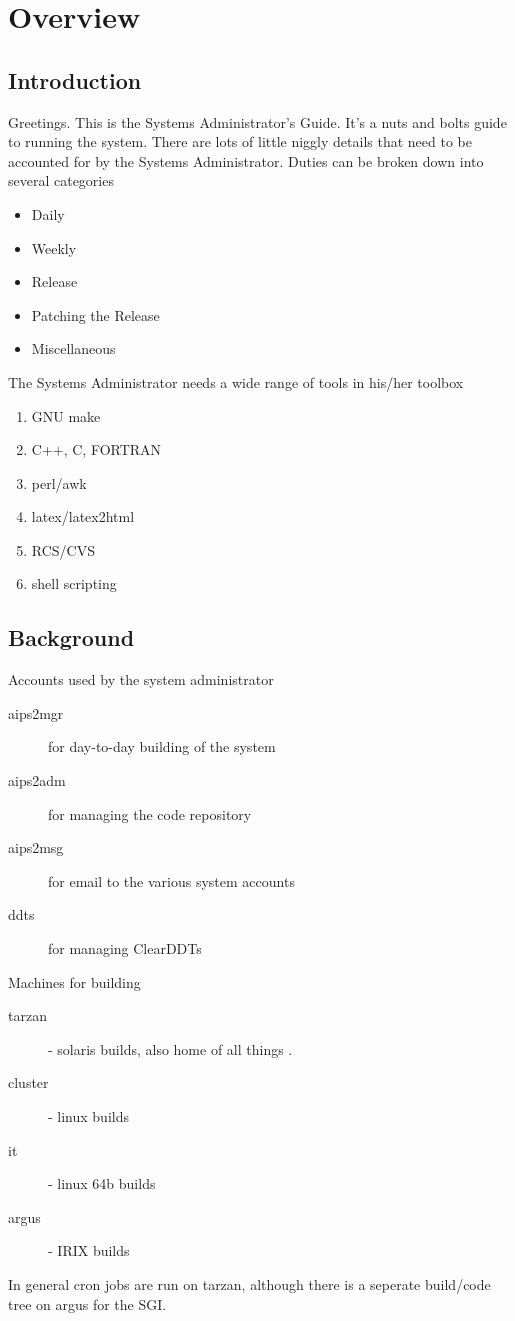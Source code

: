 \chapter{Overview}

\section{Introduction}
Greetings.  This is the \aipspp Systems Administrator's Guide.  It's a nuts and bolts guide to
running the system.  There are lots of little niggly details that need to be accounted for by
the \aipspp Systems Administrator.  Duties can be broken down into several categories
\begin{itemize}
\item Daily
\item Weekly
\item Release
\item Patching the Release
\item Miscellaneous
\end{itemize}

The \aipspp Systems Administrator needs a wide range of tools in his/her toolbox

\begin{enumerate}
\item GNU make
\item C++, C, FORTRAN
\item perl/awk
\item latex/latex2html
\item RCS/CVS
\item shell scripting
\end{enumerate}

\section{Background}

Accounts used by the \aipspp system administrator
\begin{description}
\item[aips2mgr] for day-to-day building of the system
\item[aips2adm] for managing the code repository
\item[aips2msg] for email to the various \aipspp system accounts
\item[ddts] for managing ClearDDTs
\end{description}

Machines for building \aipspp
\begin{description}
\item[tarzan] - solaris builds, also home of all things \aipspp.
\item[cluster] - linux builds
\item[it] - linux 64b builds
\item[argus] - IRIX builds
\end{description}

In general cron jobs are run on tarzan, although there is a seperate build/code tree on argus for
the SGI.
